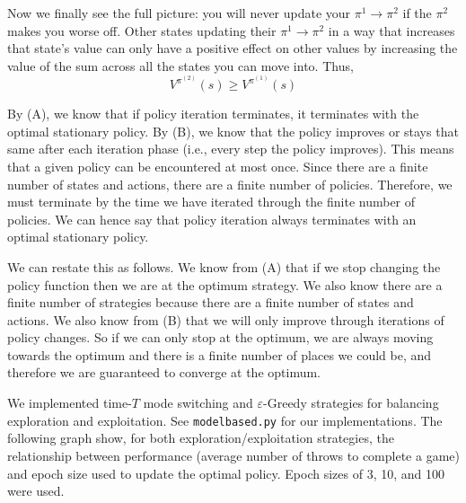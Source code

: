 \documentclass[solution, letterpaper]{cs121}
\begin{document}
Now we finally see the full picture: you will never update your $\pi^1 \rightarrow \pi^2$ if the $\pi^2$ makes you worse off. Other states updating their $\pi^1 \rightarrow \pi^2$ in a way that increases that state's value can only have a positive effect on other values by increasing the value of the sum across all the states you can move into. Thus, \[ V^{\pi^{(2)}} (s) \ge V^{\pi^{(1)}}(s) \]

\subproblem{} %
By (A), we know that if policy iteration terminates, it terminates with the optimal stationary policy. By (B), we know that the policy improves or stays that same after each iteration phase (i.e., every step the policy improves). This means that a given policy can be encountered at most once. Since there are a finite number of states and actions, there are a finite number of policies. Therefore, we must terminate by the time we have iterated through the finite number of policies. We can hence say that policy iteration always terminates with an optimal stationary policy.

We can restate this as follows. We know from (A) that if we stop changing the policy function then we are at the optimum strategy. We also know there are a finite number of strategies because there are a finite number of states and actions. We also know from (B) that we will only improve through iterations of policy changes. So if we can only stop at the optimum, we are always moving towards the optimum and there is a finite number of places we could be, and therefore we are guaranteed to converge at the optimum.



\subproblem{} %
We implemented time-$T$ mode switching and $\varepsilon$-Greedy strategies for balancing exploration and exploitation. See {\tt modelbased.py} for our implementations. The following graph show, for both exploration/exploitation strategies, the relationship between performance (average number of throws to complete a game) and epoch size used to update the optimal policy. Epoch sizes of 3, 10, and 100 were used.
\end{document}
